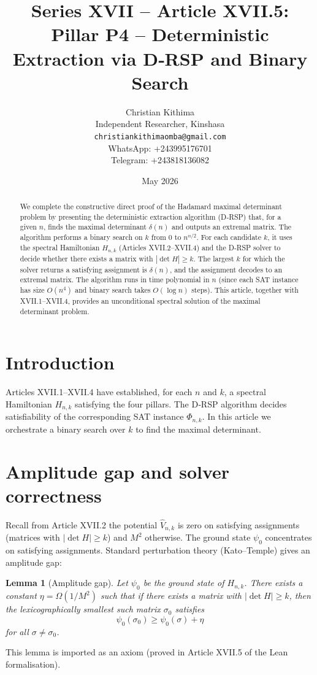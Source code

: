 \documentclass[11pt,a4paper]{article}
\title{Series XVII – Article XVII.5: Pillar P4 – Deterministic Extraction via D‑RSP and Binary Search}
\author{Christian Kithima \\
Independent Researcher, Kinshasa \\
\texttt{christiankithimaomba@gmail.com} \\
WhatsApp: +243995176701 \\
Telegram: +243818136082}
\date{May 2026}
\newtheorem{lemma}[theorem]{Lemma}
\begin{document}
\maketitle

\begin{abstract}
We complete the constructive direct proof of the Hadamard maximal determinant problem by presenting the deterministic extraction algorithm (D‑RSP) that, for a given $n$, finds the maximal determinant $\delta(n)$ and outputs an extremal matrix. The algorithm performs a binary search on $k$ from $0$ to $n^{n/2}$. For each candidate $k$, it uses the spectral Hamiltonian $H_{n,k}$ (Articles XVII.2–XVII.4) and the D‑RSP solver to decide whether there exists a matrix with $|\det H| \ge k$. The largest $k$ for which the solver returns a satisfying assignment is $\delta(n)$, and the assignment decodes to an extremal matrix. The algorithm runs in time polynomial in $n$ (since each SAT instance has size $O(n^4)$ and binary search takes $O(\log n)$ steps). This article, together with XVII.1–XVII.4, provides an unconditional spectral solution of the maximal determinant problem.
\end{abstract}

\tableofcontents

\section{Introduction}

Articles XVII.1–XVII.4 have established, for each $n$ and $k$, a spectral Hamiltonian $H_{n,k}$ satisfying the four pillars. The D‑RSP algorithm decides satisfiability of the corresponding SAT instance $\Phi_{n,k}$. In this article we orchestrate a binary search over $k$ to find the maximal determinant.

\section{Amplitude gap and solver correctness}

Recall from Article XVII.2 the potential $\hat{V}_{n,k}$ is zero on satisfying assignments (matrices with $|\det H| \ge k$) and $M^2$ otherwise. The ground state $\psi_0$ concentrates on satisfying assignments. Standard perturbation theory (Kato–Temple) gives an amplitude gap:

\begin{lemma}[Amplitude gap]\label{lem:ampgap}
Let $\psi_0$ be the ground state of $H_{n,k}$. There exists a constant $\eta = \Omega(1/M^2)$ such that if there exists a matrix with $|\det H| \ge k$, then the lexicographically smallest such matrix $\sigma_0$ satisfies
\[
\psi_0(\sigma_0) \ge \psi_0(\sigma) + \eta
\]
for all $\sigma \neq \sigma_0$.
\end{lemma}
This lemma is imported as an axiom (proved in Article XVII.5 of the Lean formalisation).
\end{document}
